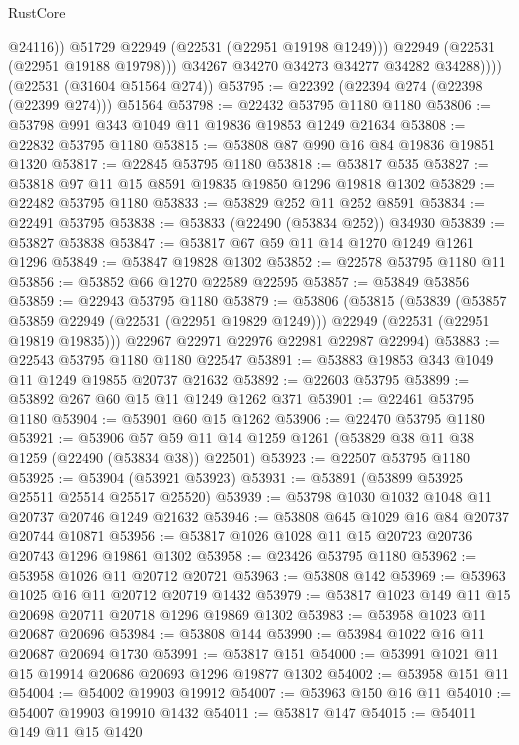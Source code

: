 \begin{lexlean}{RustCore}
\begin{coremodule}
                    @24116))
                @51729
                @22949
                (@22531 (@22951 @19198 @1249)))
              @22949
              (@22531 (@22951 @19188 @19798)))
            @34267
            @34270
            @34273
            @34277
            @34282
            @34288))))
    (@22531 (@31604 @51564 @274))
@53795 := @22392 (@22394 @274 (@22398 (@22399 @274))) @51564
@53798 := @22432 @53795 @1180 @1180
@53806 := @53798 @991 @343 @1049 @11 @19836 @19853 @1249 @21634
@53808 := @22832 @53795 @1180
@53815 := @53808 @87 @990 @16 @84 @19836 @19851 @1320
@53817 := @22845 @53795 @1180
@53818 := @53817 @535
@53827 := @53818 @97 @11 @15 @8591 @19835 @19850 @1296 @19818 @1302
@53829 := @22482 @53795 @1180
@53833 := @53829 @252 @11 @252 @8591
@53834 := @22491 @53795
@53838 := @53833 (@22490 (@53834 @252)) @34930
@53839 := @53827 @53838
@53847 := @53817 @67 @59 @11 @14 @1270 @1249 @1261 @1296
@53849 := @53847 @19828 @1302
@53852 := @22578 @53795 @1180 @11
@53856 := @53852 @66 @1270 @22589 @22595
@53857 := @53849 @53856
@53859 := @22943 @53795 @1180
@53879 := @53806
    (@53815
      (@53839
        (@53857 @53859 @22949 (@22531 (@22951 @19829 @1249)))
        @22949
        (@22531 (@22951 @19819 @19835)))
      @22967
      @22971
      @22976
      @22981
      @22987
      @22994)
@53883 := @22543 @53795 @1180 @1180 @22547
@53891 := @53883 @19853 @343 @1049 @11 @1249 @19855 @20737 @21632
@53892 := @22603 @53795
@53899 := @53892 @267 @60 @15 @11 @1249 @1262 @371
@53901 := @22461 @53795 @1180
@53904 := @53901 @60 @15 @1262
@53906 := @22470 @53795 @1180
@53921 := @53906 @57 @59 @11 @14 @1259 @1261 (@53829 @38 @11 @38 @1259 (@22490 (@53834 @38)) @22501)
@53923 := @22507 @53795 @1180
@53925 := @53904 (@53921 @53923)
@53931 := @53891 (@53899 @53925 @25511 @25514 @25517 @25520)
@53939 := @53798 @1030 @1032 @1048 @11 @20737 @20746 @1249 @21632
@53946 := @53808 @645 @1029 @16 @84 @20737 @20744 @10871
@53956 := @53817 @1026 @1028 @11 @15 @20723 @20736 @20743 @1296 @19861 @1302
@53958 := @23426 @53795 @1180
@53962 := @53958 @1026 @11 @20712 @20721
@53963 := @53808 @142
@53969 := @53963 @1025 @16 @11 @20712 @20719 @1432
@53979 := @53817 @1023 @149 @11 @15 @20698 @20711 @20718 @1296 @19869 @1302
@53983 := @53958 @1023 @11 @20687 @20696
@53984 := @53808 @144
@53990 := @53984 @1022 @16 @11 @20687 @20694 @1730
@53991 := @53817 @151
@54000 := @53991 @1021 @11 @15 @19914 @20686 @20693 @1296 @19877 @1302
@54002 := @53958 @151 @11
@54004 := @54002 @19903 @19912
@54007 := @53963 @150 @16 @11
@54010 := @54007 @19903 @19910 @1432
@54011 := @53817 @147
@54015 := @54011 @149 @11 @15 @1420

\end{coremodule}
\end{lexlean}
